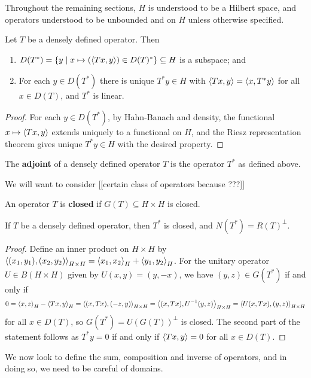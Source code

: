 \documentclass[10pt]{amsart}
\begin{document}
Throughout the remaining sections, $H$ is understood to be a Hilbert space, and operators understood to be unbounded and on $H$ unless otherwise specified.
\begin{lemma}
    Let $T$ be a densely defined operator. Then
    \begin{enumerate}
        \item $D(T^*) = \left\{  y \mid x \mapsto (\left\langle Tx, y \right\rangle) \in D(T)^*  \right\} \subseteq H$ is a subspace; and
        \item For each $y \in D(T^*)$ there is unique $T^*y \in H$ with $\left\langle Tx, y \right\rangle = \left\langle x, T^*y \right\rangle$ for all $x \in D(T)$, and $T^*$ is linear.
    \end{enumerate}
\end{lemma}
\begin{proof}
    For each $y \in D(T^*)$, by Hahn-Banach and density, the functional $x \mapsto \left\langle Tx, y \right\rangle$ extends uniquely to a functional on $H$, and the Riesz representation theorem gives unique $T^*y \in H$ with the desired property.
\end{proof}
\begin{definition}[Adjoint]
    The \textbf{adjoint} of a densely defined operator $T$ is the operator $T^*$ as defined above. 
\end{definition}
We will want to consider [[certain class of operators because ???]]
\begin{definition}
    An operator $T$ is \textbf{closed} if $G(T) \subseteq H \times H$ is closed.
\end{definition}
\begin{proposition}
    If $T$ be a densely defined operator, then $T^*$ is closed, and $N(T^*) = R(T)^\perp$.
\end{proposition}
\begin{proof}
    Define an inner product on $H \times H$ by $\left\langle (x_1, y_1), (x_2, y_2) \right\rangle_{H \times H} = \left\langle x_1, x_2 \right\rangle_H + \left\langle y_1, y_2 \right\rangle_H$. For the unitary operator $U \in B(H \times H)$ given by $U(x, y) = (y, -x)$, we have $(y, z) \in G(T^*)$ if and only if 
    $$
        0 = \left\langle x, z \right\rangle_H - \left\langle Tx, y \right\rangle_H = \left\langle (x, Tx), (-z, y) \right\rangle_{H \times H} = \left\langle (x, Tx), U^{-1}(y, z) \right\rangle_{H \times H} = \left\langle U(x, Tx), (y, z) \right\rangle_{H \times H}
    $$
    for all $x \in D(T)$, so $G(T^*) = U(G(T))^\perp$ is closed. The second part of the statement follows as $T^*y = 0$ if and only if $\left\langle Tx, y \right\rangle = 0$ for all $x \in D(T)$.
\end{proof}
We now look to define the sum, composition and inverse of operators, and in doing so, we need to be careful of domains.
\end{document}
